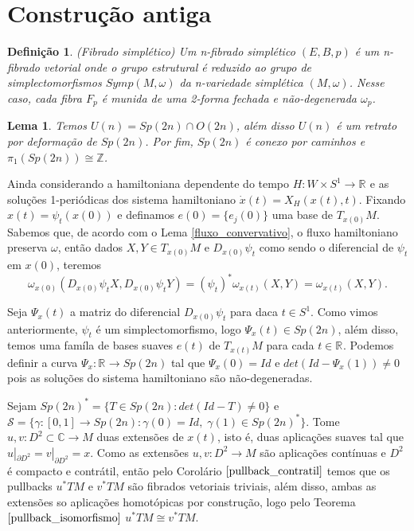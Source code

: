 \documentclass[12pt]{book}
\newtheorem{lema}[teorema]{Lema}
\newtheorem{definicao}[teorema]{Definição}
\newcommand{\inteiros}{\mathbb{Z}}
\newcommand{\real}[1]{\mathbb{R}^{#1}}
\begin{document}
	
		
	\section{Construção antiga}
	\begin{definicao}
		(Fibrado simplético) Um n-fibrado simplético $(E,B, p)$ é um n-fibrado vetorial onde o grupo estrutural é reduzido ao grupo de simplectomorfismos $Symp(M,\omega)$ da n-variedade simplética $(M,\omega)$. Nesse caso, cada fibra $F_{p}$ é munida de uma 2-forma fechada e não-degenerada $\omega_{p}$.
	\end{definicao}
	
	\begin{lema}\label{Sp2n_homotopia}
		Temos $U(n) = Sp(2n)\cap O(2n)$, além disso $U(n)$ é um retrato por deformação de $Sp(2n)$. Por fim, $Sp(2n)$ é conexo por caminhos e $\pi_{1}(Sp(2n)) \cong \inteiros$.
	\end{lema}
	
	Ainda considerando a hamiltoniana dependente do tempo $H:W \times S^{1} \to \real{}$ e as soluções 1-periódicas dos sistema hamiltoniano $\dot{x}(t) = X_{H}(x(t), t)$. Fixando $x(t) = \psi_{t}(x(0))$ e definamos $e(0) = \{e_{j}(0)\}$ uma base de $T_{x(0)}M$. Sabemos que, de acordo com o Lema \ref{fluxo_convervativo}, o fluxo hamiltoniano preserva $\omega$, então dados $X,Y \in T_{x(0)}M$ e $D_{x(0)}\psi_{t}$ como sendo o diferencial de $\psi_{t}$ em $x(0)$, teremos
	$$
	\omega_{x(0)}(D_{x(0)}\psi_{t}X, D_{x(0)}\psi_{t}Y)=(\psi_{t})^{*}\omega_{x(t)}(X,Y) = \omega_{x(t)}(X,Y).
	$$
	
	Seja $\Psi_{x}(t)$ a matriz do diferencial $D_{x(0)}\psi_{t}$ para daca $t\in S^{1}$. Como vimos anteriormente, $\psi_{t}$ é um simplectomorfismo, logo $\Psi_{x}(t) \in Sp(2n)$, além disso, temos uma famíla de bases suaves $e(t)$ de $T_{x(t)}M$ para cada $t \in \real{}$. Podemos definir a curva $\Psi_{x}:\real{} \to Sp(2n)$ tal que $\Psi_{x}(0) = Id$ e $det(Id-\Psi_{x}(1)) \neq 0$ pois as soluções do sistema hamiltoniano são não-degeneradas.
	
	Sejam $Sp(2n)^{*} = \{T\in Sp(2n): det(Id-T) \neq 0\}$ e $\mathcal{S} = \{\gamma:[0,1] \to Sp(2n): \gamma(0) = Id,\; \gamma(1)\in Sp(2n)^{*} \}$. Tome $u,v : D^{2} \subset \mathbb{C} \to M$ duas extensões de $x(t)$, isto é, duas aplicações suaves tal que $u|_{\partial D^{2}} = v|_{\partial D^{2}} = x$. Como as extensões $u,v:D^{2} \to M$ são aplicações contínuas e $D^{2}$ é compacto e contrátil, então pelo Corolário $\ref{pullback_contratil}$ temos que os pullbacks $u^{*}TM$ e $v^{*}TM$ são fibrados vetoriais triviais, além disso, ambas as extensões so aplicações homotópicas por construção, logo pelo Teorema $\ref{pullback_isomorfismo}$  $u^{*}TM \cong v^{*}TM$.
	
\end{document}
